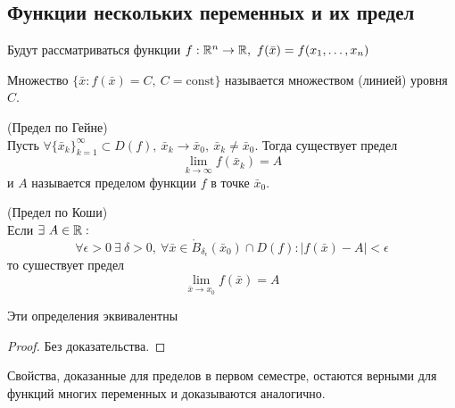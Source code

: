 \subsection{Функции нескольких переменных и их предел}
Будут рассматриваться функции $f: \mathbb{R}^n\to \mathbb{R},\ f(\bar{x})=f(x_1, \dots, x_n)$
\begin{definition}
    Множество $\{\bar{x}: f(\bar{x})=C,\ C=\text{const}\}$ называется множеством (линией) уровня $C$.
\end{definition} 
\begin{definition} (Предел по Гейне)\\
    Пусть $\forall \{\bar{x}_k\}_{k=1}^{\infty}\subset D(f),\ \bar{x}_k\to \bar{x}_0,\ \bar{x}_k\ne \bar{x}_0$. Тогда существует предел
    \[\lim\limits_{k\to \infty}f(\bar{x}_k)=A\]
    и $A$ называется пределом функции $f$ в точке $\bar{x}_0$.
\end{definition} 
\begin{definition} (Предел по Коши)\\
    Если $\exists\ A\in \mathbb{R}:$
    \[\forall \epsilon>0\ \exists\ \delta>0,\ \forall \bar{x}\in \mathring{B}_{\delta_\epsilon}(\bar{x}_0)\cap D(f): |f(\bar{x})-A|<\epsilon\]
    то сушествует предел 
    \[\lim\limits_{\bar{x}\to x_0}f(\bar{x})=A\]
\end{definition} 
\begin{theorem}
    Эти определения эквивалентны
\end{theorem} 
\begin{proof}
    Без доказательства.
\end{proof} 
\begin{comm}
    Свойства, доказанные для пределов в первом семестре, остаются верными для функций многих переменных и доказываются аналогично.
\end{comm} 